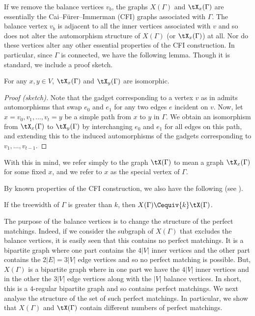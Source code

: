 \documentclass{toc}
\begin{document}
If we remove the balance vertices $v_b$, the graphs $X(\Gamma)$ and $\tX_x(\Gamma)$ are
essentially the Cai--F\"{u}rer--Immerman (CFI) %
%
graphs associated with $\Gamma$. The
balance vertex $v_b$ is adjacent to all the inner vertices associated with $v$
and so does not alter the automorphism structure of $X(\Gamma)$ (or $\tX_x(\Gamma)$) at
all. Nor do these vertices alter any other essential properties of the CFI
construction. In particular, since $\Gamma$ is connected, we have the following
lemma. Though it is standard, we include a proof sketch.
\begin{lemma}\label{lem:v-irrelevant}
  For any $x,y \in V$, $\tX_x(\Gamma)$ and $\tX_y(\Gamma)$ are isomorphic.
\end{lemma}
\begin{proof}[Proof (sketch)]
  Note that the gadget corresponding to a vertex $v$ as in
   admits automorphisms that swap $e_0$ and $e_1$ for any
  two edges $e$ incident on $v$. Now, let $x=v_0,v_1,\ldots,v_t = y$ be a simple
  path from $x$ to $y$ in $\Gamma$. We obtain an isomorphism from $\tX_x(\Gamma)$ to
  $\tX_y(\Gamma)$ by interchanging $e_0$ and $e_1$ for all edges on this path, and
  extending this to the induced automorphisms of the gadgets corresponding to
  $v_1,\ldots,v_{t-1}$.
\end{proof}
With this in mind, we refer simply to the graph $\tX(\Gamma)$ to mean a graph
$\tX_x(\Gamma)$ for some fixed $x$, and we refer to $x$ as the special vertex of $\Gamma$.


By known properties of the CFI construction, we also have the following
(see \cite[Theorem~3]{DR07}).
\begin{lemma}\label{lem:cfi}
  If the treewidth of $\Gamma$ is greater than $k$, then $X(\Gamma) \Cequiv{k} \tX(\Gamma)$.
\end{lemma}


The purpose of the balance vertices is to change the structure of the perfect
matchings. Indeed, if we consider the subgraph of $X(\Gamma)$ that
excludes the balance vertices, it is easily seen that this contains no perfect
matchings. It is a bipartite graph where one part contains the $4|V|$ inner
vertices and the other part contains the $2|E| = 3|V|$ edge vertices and so no
perfect matching is possible. But, $X(\Gamma)$ is a bipartite graph where in one part
we have the $4|V|$ inner vertices and in the other the $3|V|$ edge vertices
along with the $|V|$ balance vertices. In short, this is a $4$-regular bipartite
graph and so contains perfect matchings. We next analyse the structure of the
set of such perfect matchings. In particular, we show that $X(\Gamma)$ and $\tX(\Gamma)$
contain different numbers of perfect matchings.
\end{document}
